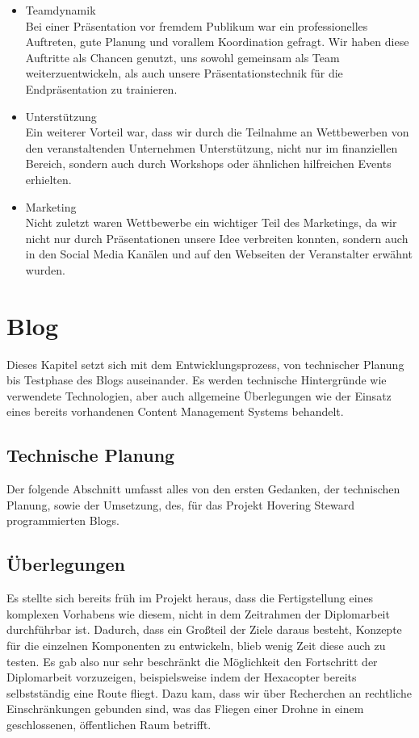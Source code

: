     \begin{itemize}
      \item Teamdynamik\\
      Bei einer Präsentation vor fremdem Publikum war ein professionelles Auftreten, gute Planung und vorallem Koordination gefragt.
      Wir haben diese Auftritte als Chancen genutzt, uns sowohl gemeinsam als Team weiterzuentwickeln, als auch unsere Präsentationstechnik für
      die Endpräsentation zu trainieren.

      \item Unterstützung\\
      Ein weiterer Vorteil war, dass wir durch die Teilnahme an Wettbewerben von den veranstaltenden Unternehmen Unterstützung, nicht nur im finanziellen
      Bereich, sondern auch durch Workshops oder ähnlichen hilfreichen Events erhielten.

      \item Marketing\\
      Nicht zuletzt waren Wettbewerbe ein wichtiger Teil des Marketings, da wir nicht nur durch Präsentationen unsere Idee verbreiten konnten,
      sondern auch in den Social Media Kanälen und auf den Webseiten der Veranstalter erwähnt wurden.
    \end{itemize}

\section{Blog}
Dieses Kapitel setzt sich mit dem Entwicklungsprozess, von technischer Planung bis Testphase
des Blogs auseinander. Es werden technische Hintergründe wie verwendete Technologien, aber
auch allgemeine Überlegungen wie der Einsatz eines bereits vorhandenen Content Management Systems
behandelt.

  \subsection{Technische Planung}
  Der folgende Abschnitt umfasst alles von den ersten Gedanken, der technischen Planung, sowie der Umsetzung,
  des, für das Projekt Hovering Steward programmierten Blogs.

    \subsection{Überlegungen}
    Es stellte sich bereits früh im Projekt heraus, dass die Fertigstellung eines komplexen Vorhabens wie diesem, nicht in
    dem Zeitrahmen der Diplomarbeit durchführbar ist. Dadurch, dass ein Großteil der Ziele daraus besteht, Konzepte für die
    einzelnen Komponenten zu entwickeln, blieb wenig Zeit diese auch zu testen. Es gab also nur sehr beschränkt die Möglichkeit
    den Fortschritt der Diplomarbeit vorzuzeigen, beispielsweise indem der Hexacopter bereits selbstständig eine Route fliegt.
    Dazu kam, dass wir über Recherchen an rechtliche Einschränkungen gebunden sind, was das Fliegen einer Drohne in einem
    geschlossenen, öffentlichen Raum betrifft.


